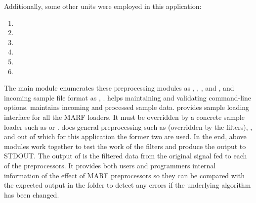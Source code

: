 Additionally, some other units were employed in this application:

\begin{enumerate}
\item
{}
\item
{}
\item
{}
\item
{}
\item
{}
\item
{}
\end{enumerate}

The main  module enumerates
these preprocessing modules as , , , and
, and incoming sample file format as , .  helps maintaining and
validating command-line options.  maintains incoming and processed sample data.  provides sample loading
interface for all the MARF loaders. It must be overridden by a concrete sample loader such as  or .
 does
general preprocessing such as  (overridden by the filters),
,  and  out of which
for this application the former two are used.
In the end, above modules work together to test the work of the filters and produce
the output to STDOUT.
The output of  is the filtered data from the original signal fed to each
of the preprocessors. It provides both users and programmers internal
information of the effect of MARF preprocessors so they can be compared with the
expected output in the  folder to detect any errors if the underlying
algorithm has been changed.
